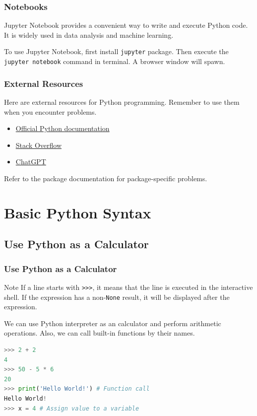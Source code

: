 \documentclass[beamer, en, version=2.0]{huangfusl-template}
\begin{document}
    \begin{frame}[fragile]
        \frametitle{Notebooks}

        Jupyter Notebook provides a convenient way to write and execute Python code. It is widely used in data analysis and machine learning.

        To use Jupyter Notebook, first install {\footnotesize\verb|jupyter|} package. Then execute the {\footnotesize\verb|jupyter notebook|} command in terminal. A browser window will spawn.
    \end{frame}
    \begin{frame}[fragile]
        \frametitle{External Resources}

        Here are external resources for Python programming. Remember to use them when you encounter problems.

        \begin{itemize}
            \item \href{https://docs.python.org/3/}{\color{darkblue} Official Python documentation}
            \item \href{https://www.stackoverflow.com/}{\color{darkblue} Stack Overflow}
            \item \href{https://chat.openai.com/}{\color{darkblue} ChatGPT}
        \end{itemize}

        Refer to the package documentation for package-specific problems.
    \end{frame}
    \section{Basic Python Syntax}
    \subsection{Use Python as a Calculator}
    \begin{frame}[fragile]
        \frametitle{Use Python as a Calculator}

        \begin{block}{Note}
            If a line starts with {\footnotesize\verb|>>>|}, it means that the line is executed in the interactive shell. If the expression has a non-{\footnotesize\verb|None|} result, it will be displayed after the expression.
        \end{block}

        We can use Python interpreter as an calculator and perform arithmetic operations. Also, we can call built-in functions by their names.

\begin{lstlisting}[language=python]
>>> 2 + 2
4
>>> 50 - 5 * 6
20
>>> print('Hello World!') # Function call
Hello World!
>>> x = 4 # Assign value to a variable
\end{lstlisting}
    \end{frame}
\end{document}
